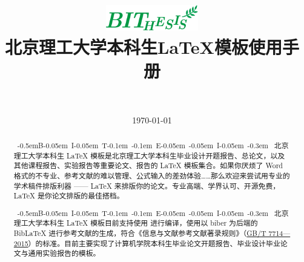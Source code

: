 \documentclass[UTF8,AutoFakeBold,AutoFakeSlant,12pt]{ctexart}
\makeatletter
\newcommand{\version}{v0.0.2}
\def\matex@ssize{\larger[-1]\scshape}
\DeclareRobustCommand{\BIThesis}{
  \mbox{
    \kern-0.5em{B}\kern-0.05em
    {I}\kern-0.05em
    {T}\kern-0.1em
    \raisebox{-0.38ex}{\matex@ssize {H}}\kern-0.1em
    {\matex@ssize {E}}\kern-0.05em
    \raisebox{-0.38ex}{\matex@ssize {S}}\kern-0.05em
    {\matex@ssize {I}}\kern-0.05em
    \raisebox{-0.35ex}{\matex@ssize {S}}\kern-0.3em
   }
}
\makeatother
\begin{document}
\title{
\includegraphics[width=0.3\textwidth]{images/icon.png}
\\[1cm]
\bfseries 北京理工大学本科生{\LaTeX}模板使用手册
}
\author{
  \href{https://github.com/spencerwooo/BIThesis}{\color{RoyalBlue}{spencerwooo/BIThesis}}
  \\
}
\date{ \today\quad \color{RubineRed}{\kaishu 版本 \version}}
\maketitle

\begin{abstract}
  {\BIThesis} 北京理工大学本科生 {\LaTeX} 模板是北京理工大学本科生毕业设计开题报告、总论文，以及其他课程报告、实验报告等重要论文、报告的 {\LaTeX} 模板集合。如果你厌烦了 Word 格式的不专业、参考文献的难以管理、公式输入的差劲体验……那么欢迎来尝试用专业的学术稿件排版利器 —— {\LaTeX} 来排版你的论文。专业高端、学界认可、开源免费，{\LaTeX} 是你论文排版的最佳搭档。

  {\BIThesis} 北京理工大学本科生 {\LaTeX} 模板目前支持使用 {} 进行编译，使用以 biber 为后端的 BibLaTeX 进行参考文献的生成，符合《信息与文献参考文献著录规则》（\href{http://openstd.samr.gov.cn/bzgk/gb/newGbInfo?hcno=7FA63E9BBA56E60471AEDAEBDE44B14C}{GB/T 7714—2015}）的标准。目前主要实现了计算机学院本科生毕业论文开题报告、毕业设计毕业论文与通用实验报告的模板。
\end{abstract}

\tableofcontents
\clearpage
\setlength{\parskip}{0.8ex}








\end{document}
